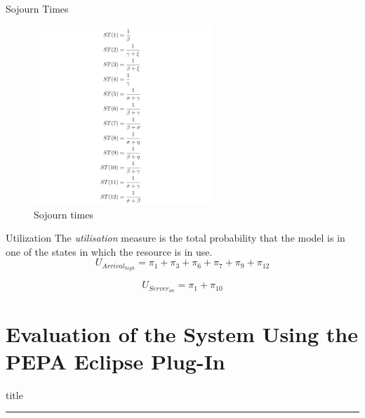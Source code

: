 \documentclass[8pt]{beamer}
\begin{document}
    \begin{frame}{Sojourn Times}
        \begin{figure}[h]
            \centering
            \includegraphics[width=0.6\textwidth]{Images/sojourn-times.png}
            \caption{Sojourn times}
            \label{fig:sojourn-times}
        \end{figure}
    \end{frame}
    
    \begin{frame}{Utilization}
        The \textit{utilisation} measure is the total probability that the model is in one of the states in which the resource is in use.\newline
        \[U_{Arrival_{high}} = \pi_{1} + \pi_{3} + \pi_{6} + \pi_{7} + \pi_{9} + \pi_{12}\]
        
        \[U_{Server_{on}} = \pi_{1} + \pi_{10}\]
    \end{frame}

\section{Evaluation of the System Using the PEPA Eclipse Plug-In}
    \begin{frame}[plain]
        \vfill
        \centering
        \begin{beamercolorbox}[sep=8pt,center,shadow=true,rounded=true]{title}
            \insertsectionhead\par
            \color{univered}\noindent\rule{10cm}{1pt} \\
            \LARGE{\faFileTextO}
        \end{beamercolorbox}
        \vfill
    \end{frame}
    
\end{document}
